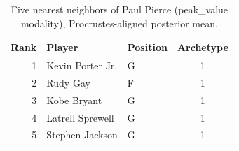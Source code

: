 \begin{table}[htbp]
  \centering\small
  \begin{tabular}{rllc}
    \toprule
    Rank & Player & Position & Archetype \\
    \midrule
    1 & Kevin Porter Jr. & G & 1 \\
    2 & Rudy Gay & F & 1 \\
    3 & Kobe Bryant & G & 1 \\
    4 & Latrell Sprewell & G & 1 \\
    5 & Stephen Jackson & G & 1 \\
    \bottomrule
  \end{tabular}
  \caption{Five nearest neighbors of Paul Pierce (peak_value modality), Procrustes-aligned posterior mean.}
  \label{tab:Paul_Pierce_neighbors_peak_value}
\end{table}

